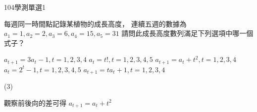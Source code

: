 \begin{QUESTIONS}
    \begin{QUESTION}
        \begin{ExamInfo}{104}{學測}{單選}{1}
        \end{ExamInfo}
        \begin{ExamAnsRateInfo}{88}{99}{98}{67}
        \end{ExamAnsRateInfo}
        \begin{QBODY}
            每週同一時間點記錄某植物的成長高度， 連續五週的數據為
			${{a}_{1}}=1, {{a}_{2}}=2, {{a}_{3}}=6,{{a}_{4}}=15, {{a}_{5}}=31$
			請問此成長高度數列滿足下列選項中哪一個式子？
			\begin{QOPS}
				\QOP ${{a}_{t+1}}=3{{a}_{t}}-1,t=1,2,3,4$
				\QOP ${{a}_{t}}=t!,t=1,2,3,4,5$
				\QOP ${{a}_{t+1}}={{a}_{t}}+{{t}^{2}},t=1,2,3,4$
				\QOP ${{a}_{t}}={{2}^{t}}-1,t=1,2,3,4,5$
				\QOP ${{a}_{t+1}}=t{{a}_{t}}+1,t=1,2,3,4$
			\end{QOPS}
        \end{QBODY}
        \begin{QFROMS}
        \end{QFROMS}
        \begin{QTAGS}\end{QTAGS}
        \begin{QANS}
            (3)
        \end{QANS}
        \begin{QSOLLIST}
            \begin{QSOL}[SOLID=12]
				觀察前後向的差可得 ${{a}_{t+1}}={{a}_{t}}+{{t}^{2}}$
			\end{QSOL}


\end{QSOLLIST}
\end{QUESTION}
\end{QUESTIONS}
